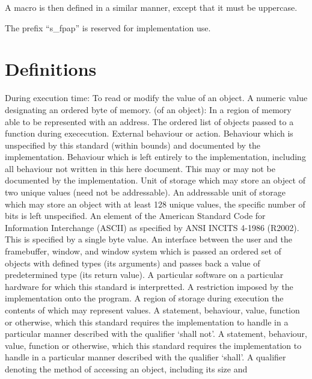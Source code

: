A macro is then defined in a similar manner, except that it must be uppercase.

The prefix ``s\_fpap'' is reserved for implementation use.

\section{Definitions}

{}
During execution time: To read or modify the value of an object.
A numeric value designating an ordered byte of memory.
(of an object): In a region of memory able to be represented with an address.
The ordered list of objects passed to a function during exececution.
External behaviour or action.
Behaviour which is unspecified by this standard (within bounds) and documented
by the implementation.
Behaviour which is left entirely to the implementation, including all behaviour
not written in this here document. This may or may not be documented by the
implementation.
Unit of storage which may store an object of two unique values (need not be
addressable).
An addressable unit of storage which may store an object with at least 128
unique values, the specific number of bits is left unspecified.
An element of the American Standard Code for Information Interchange (ASCII)
as specified by ANSI INCITS 4-1986 (R2002). This is specified by a single byte
value.
An interface between the user and the framebuffer, window, and window system
which is passed an ordered set of objects with defined types (its arguments)
and passes back a value of predetermined type (its return value).
A particular software on a particular hardware for which this standard is
interpretted.
A restriction imposed by the implementation onto the program.
A region of storage during execution the contents of which may represent
values.
A statement, behaviour, value, function or otherwise, which this standard
requires the implementation to handle in a particular manner described with
the qualifier `shall not'.
A statement, behaviour, value, function or otherwise, which this standard
requires the implementation to handle in a particular manner described with
the qualifier `shall'.
A qualifier denoting the method of accessing an object, including its size and
